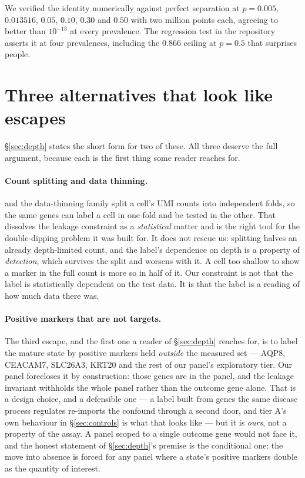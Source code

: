 We verified the identity numerically against perfect separation at $p = 0.005$,
$0.013516$, $0.05$, $0.10$, $0.30$ and $0.50$ with two million points each,
agreeing to better than $10^{-13}$ at every prevalence. The regression test in
the repository asserts it at four prevalences, including the $0.866$ ceiling at
$p = 0.5$ that surprises people.


\section{Three alternatives that look like escapes}
\label{app:alternatives}

\S\ref{sec:depth} states the short form for two of these. All three deserve
the full argument, because each is the first thing some reader reaches for.

\paragraph{Count splitting and data thinning.} \citet{neufeld2023} and the
data-thinning family split a cell's UMI counts into independent folds, so the
same genes can label a cell in one fold and be tested in the other. That
dissolves the leakage constraint as a \emph{statistical} matter and is the
right tool for the double-dipping problem it was built for. It does not rescue
us: splitting halves an already depth-limited count, and the label's dependence
on depth is a property of \emph{detection}, which survives the split and
worsens with it. A cell too shallow to show a marker in the full count is more
so in half of it. Our constraint is not that the label is statistically
dependent on the test data. It is that the label is a reading of how much data
there was.

\paragraph{Positive markers that are not targets.} The third escape, and the
first one a reader of \S\ref{sec:depth} reaches for, is to label the mature state
by positive markers held \emph{outside} the measured set --- AQP8, CEACAM7,
SLC26A3, KRT20 and the rest of our panel's exploratory tier. Our panel
forecloses it by construction: those genes are in the panel, and the leakage
invariant withholds the whole panel rather than the outcome gene alone. That is
a design choice, and a defensible one --- a label built from genes the same
disease process regulates re-imports the confound through a second door, and
tier A's own behaviour in \S\ref{sec:controls} is what that looks like --- but
it is \emph{ours}, not a property of the assay. A panel scoped to a single
outcome gene would not face it, and the honest statement of \S\ref{sec:depth}'s
premise is the conditional one: the move into absence is forced for any panel
where a state's positive markers double as the quantity of interest.

